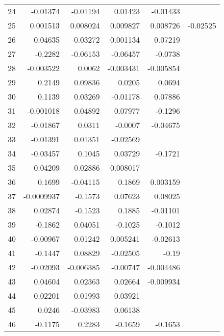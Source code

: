\begin{table}[ht]
\begin{tabular}{lrrrrr}
  24 & -0.01374 & -0.01194 & 0.01423 & -0.01433 &  \\ 
  25 & 0.001513 & 0.008024 & 0.009827 & 0.008726 & -0.02525 \\ 
  26 & 0.04635 & -0.03272 & 0.001134 & 0.07219 &  \\ 
  27 & -0.2282 & -0.06153 & -0.06457 & -0.0738 &  \\ 
  28 & -0.003522 & 0.0062 & -0.003431 & -0.005854 &  \\ 
  29 & 0.2149 & 0.09836 & 0.0205 & 0.0694 &  \\ 
  30 & 0.1139 & 0.03269 & -0.01178 & 0.07886 &  \\ 
  31 & -0.001018 & 0.04892 & 0.07977 & -0.1296 &  \\ 
  32 & -0.01867 & 0.0311 & -0.0007 & -0.04675 &  \\ 
  33 & -0.01391 & 0.01351 & -0.02569 &  &  \\ 
  34 & -0.03457 & 0.1045 & 0.03729 & -0.1721 &  \\ 
  35 & 0.04209 & 0.02886 & 0.008017 &  &  \\ 
  36 & 0.1699 & -0.04115 & 0.1869 & 0.003159 &  \\ 
  37 & -0.0009937 & -0.1573 & 0.07623 & 0.08025 &  \\ 
  38 & 0.02874 & -0.1523 & 0.1885 & -0.01101 &  \\ 
  39 & -0.1862 & 0.04051 & -0.1025 & -0.1012 &  \\ 
  40 & -0.00967 & 0.01242 & 0.005241 & -0.02613 &  \\ 
  41 & -0.1447 & 0.08829 & -0.02505 & -0.19 &  \\ 
  42 & -0.02093 & -0.006385 & -0.00747 & -0.004486 &  \\ 
  43 & 0.04604 & 0.02363 & 0.02664 & -0.009934 &  \\ 
  44 & 0.02201 & -0.01993 & 0.03921 &  &  \\ 
  45 & 0.0246 & -0.03983 & 0.06138 &  &  \\ 
  46 & -0.1175 & 0.2283 & -0.1659 & -0.1653 &  \\ 
   \hline
\end{tabular}
\end{table}
